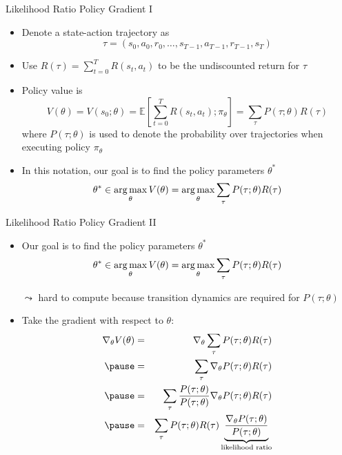 \documentclass[aspectratio=169]{../latex_main/tntbeamer}  %
\begin{document}
\begin{frame}[c]{Likelihood Ratio Policy Gradient I }
	
	\begin{itemize}
		\item Denote a state-action trajectory as 
		$$ \tau = (s_0, a_0, r_0, \ldots, s_{T-1}, a_{T-1}, r_{T-1}, s_T) $$
		\item Use $R(\tau) = \sum_{t=0}^{T} R(s_t, a_t)$ to be the undiscounted return for $\tau$
		\item Policy value is 
		$$V(\theta) = V(s_0; \theta) = \mathbb{E}\left[\sum_{t=0}^T R(s_t, a_t); \pi_\theta \right] = \sum_{\tau} P(\tau; \theta)R(\tau) $$
		where $P(\tau; \theta)$ is used to denote the probability over trajectories when executing policy $\pi_\theta$
		\item In this notation, our goal is to find the policy parameters $\theta^*$
		$$\theta^* \in \operatorname*{arg\,max}_{\theta} V(\theta) = \operatorname*{arg\,max}_{\theta}\sum_{\tau} P(\tau; \theta) R(\tau) $$
		
	\end{itemize}
	
\end{frame}
\begin{frame}[c]{Likelihood Ratio Policy Gradient II}
	\vspace{-1.5em}
	\begin{itemize}
		\item Our goal is to find the policy parameters $\theta^*$
		$$\theta^* \in \operatorname*{arg\,max}_{\theta} V(\theta) = \operatorname*{arg\,max}_{\theta}\sum_{\tau} P(\tau; \theta) R(\tau) $$
            \item[$\leadsto$] hard to compute because transition dynamics are required for $P(\tau; \theta)$
  
		\item Take the gradient with respect to $\theta$:
		\small
		\begin{eqnarray*}
		\nabla_\theta V(\theta) &=& \nabla_\theta \sum_{\tau} P(\tau; \theta)R(\tau)\\ \pause
		&=& \sum_{\tau} \nabla_\theta P(\tau; \theta)R(\tau)\\ \pause
		&=& \sum_{\tau} \frac{P(\tau; \theta)}{P(\tau; \theta)} \nabla_\theta P(\tau; \theta)R(\tau)\\ \pause
		&=& \sum_{\tau} P(\tau; \theta)  R(\tau) \underbrace{\frac{\nabla_\theta P(\tau; \theta)}{P(\tau; \theta)}}_{\text{likelihood ratio}} \\ 
		\end{eqnarray*} 
		
	\end{itemize}
	
\end{frame}
\end{document}
